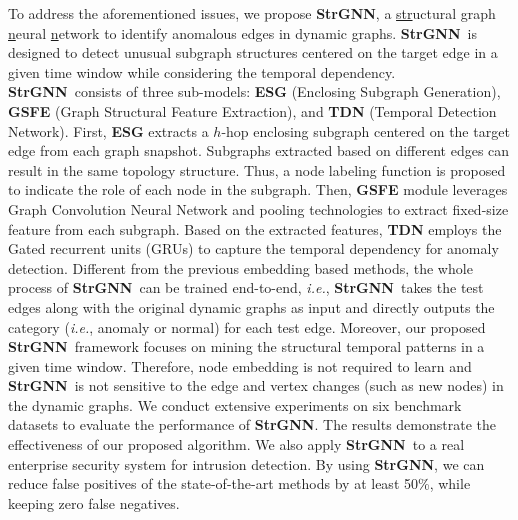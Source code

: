 \documentclass{article}
\newcommand{\model}{\textbf{StrGNN}~}
\newcommand{\modele}{\textbf{StrGNN}}
\begin{document}
To address the aforementioned issues, we propose \modele, a \underline{str}uctural \underline{g}raph \underline{n}eural \underline{n}etwork to identify anomalous edges in dynamic graphs. %
\model is designed to detect unusual subgraph structures centered on the target edge in a given time window while considering the temporal dependency. %
\model consists of three sub-models: \textbf{ESG} (Enclosing Subgraph Generation), \textbf{GSFE} (Graph Structural Feature Extraction), and \textbf{TDN} (Temporal Detection Network).
First, \textbf{ESG} extracts a $h$-hop enclosing subgraph centered on the target edge from each graph snapshot. Subgraphs extracted based on different edges can result in the same topology structure. Thus, a node labeling function is proposed to indicate the role of each node in the subgraph. %
Then, \textbf{GSFE} module leverages Graph Convolution Neural Network and pooling technologies to extract fixed-size feature from each subgraph. Based on the extracted features, %
\textbf{TDN} employs the Gated recurrent units (GRUs) to capture the temporal dependency for anomaly detection. Different from the previous embedding based methods, the whole process of \model can be trained end-to-end, \textit{i.e.}, \model takes the test edges along with the original dynamic graphs as input and directly outputs the category (\textit{i.e.}, anomaly or normal) for each test edge. Moreover, our proposed \model framework focuses on mining the structural temporal patterns in a given time window. Therefore, node embedding is not required to learn and \model is not sensitive to the edge and vertex changes (such as new nodes) in the dynamic graphs. 
We conduct extensive experiments on six benchmark datasets to evaluate the performance of \modele. The results demonstrate the effectiveness of our proposed algorithm. We also apply \model to a real enterprise security system for intrusion detection. By using \modele, we can reduce false positives of the state-of-the-art methods by at least 50\%, while keeping zero false negatives.
\end{document}
